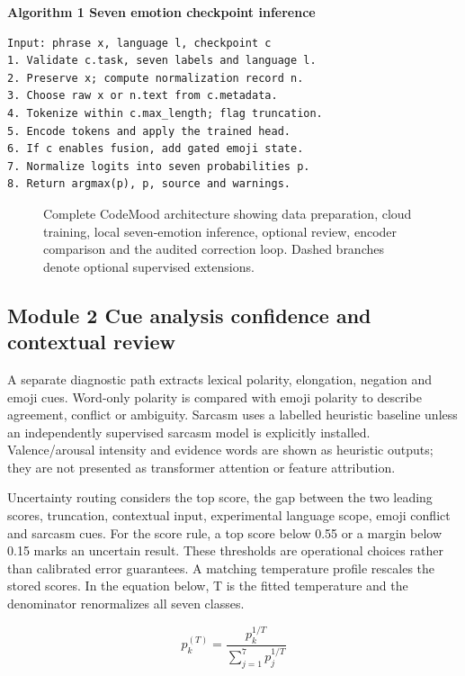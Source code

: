 \documentclass[conference]{IEEEtran}
\begin{document}
\noindent\begin{minipage}{\columnwidth}
\textbf{Algorithm 1 Seven emotion checkpoint inference}
\begin{lstlisting}
Input: phrase x, language l, checkpoint c
1. Validate c.task, seven labels and language l.
2. Preserve x; compute normalization record n.
3. Choose raw x or n.text from c.metadata.
4. Tokenize within c.max_length; flag truncation.
5. Encode tokens and apply the trained head.
6. If c enables fusion, add gated emoji state.
7. Normalize logits into seven probabilities p.
8. Return argmax(p), p, source and warnings.
\end{lstlisting}
\end{minipage}

\begin{figure}[p]
\centering
\resizebox{.96\textwidth}{!}{}
\caption{Complete CodeMood architecture showing data preparation, cloud training, local seven-emotion inference, optional review, encoder comparison and the audited correction loop. Dashed branches denote optional supervised extensions.}\label{fig:master-architecture}
\end{figure}


\subsection{Module 2 Cue analysis confidence and contextual review}

A separate diagnostic path extracts lexical polarity, elongation, negation and emoji cues. Word-only polarity is compared with emoji polarity to describe agreement, conflict or ambiguity. Sarcasm uses a labelled heuristic baseline unless an independently supervised sarcasm model is explicitly installed. Valence/arousal intensity and evidence words are shown as heuristic outputs; they are not presented as transformer attention or feature attribution.

Uncertainty routing considers the top score, the gap between the two leading scores, truncation, contextual input, experimental language scope, emoji conflict and sarcasm cues. For the score rule, a top score below 0.55 or a margin below 0.15 marks an uncertain result. These thresholds are operational choices rather than calibrated error guarantees. A matching temperature profile rescales the stored scores. In the equation below, T is the fitted temperature and the denominator renormalizes all seven classes.

\begin{equation}
p_k^{(T)}=\frac{p_k^{1/T}}{\sum_{j=1}^{7}p_j^{1/T}}
\label{eq:temperature}
\end{equation}
\end{document}
